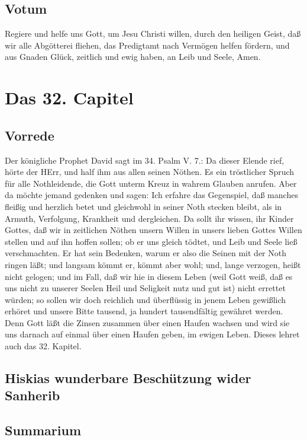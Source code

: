 \section{Votum}

Regiere und helfe uns Gott, um Jesu Christi willen, durch den heiligen Geist, daß wir alle Abgötterei fliehen, das Predigtamt nach Vermögen helfen fördern, und aus Gnaden Glück, zeitlich und ewig haben, an Leib und Seele, Amen.

\chapter{Das 32. Capitel}

\section{Vorrede}

Der königliche Prophet David sagt im 34. Psalm V. 7.: Da dieser Elende rief, hörte der HErr, und half ihm aus allen seinen Nöthen. Es ein tröstlicher Spruch für alle Nothleidende, die Gott unterm Kreuz in wahrem Glauben anrufen. Aber da möchte jemand gedenken und sagen: Ich erfahre das Gegenspiel, daß manches fleißig und herzlich betet und gleichwohl in seiner Noth stecken bleibt, als in Armuth, Verfolgung, Krankheit und dergleichen. Da sollt ihr wissen, ihr Kinder Gottes, daß wir in zeitlichen Nöthen unsern Willen in unsers lieben Gottes Willen stellen und auf ihn hoffen sollen; ob er uns gleich tödtet, und Leib und Seele ließ verschmachten. Er hat sein Bedenken, warum er also die Seinen mit der Noth ringen läßt; und langsam kömmt er, kömmt aber wohl; und, lange verzogen, heißt nicht gelogen; und im Fall, daß wir hie in diesem Leben (weil Gott weiß, daß es uns nicht zu unserer Seelen Heil und Seligkeit nutz und gut ist) nicht errettet würden; so sollen wir doch reichlich und überflüssig in jenem Leben gewißlich erhöret und unsere Bitte tausend, ja hundert tausendfältig gewähret werden. Denn Gott läßt die Zinsen zusammen über einen Haufen wachsen und wird sie uns darnach auf einmal über einen Haufen geben, im ewigen Leben. Dieses lehret auch das 32. Kapitel.

\section[Hiskias wunderbare Beschützung wider Sanherib]{Hiskias wunderbare Beschützung wider Sanherib}

\section{Summarium}

